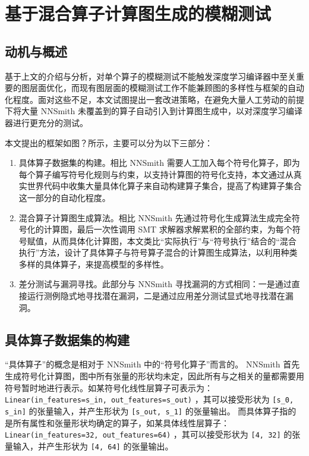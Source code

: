 
\chapter{基于混合算子计算图生成的模糊测试}

\section{动机与概述}

基于上文的介绍与分析，对单个算子的模糊测试不能触发深度学习编译器中至关重要的图层面优化，而现有图层面的模糊测试工作不能兼顾图的多样性与框架的自动化程度。面对这些不足，本文试图提出一套改进策略，在避免大量人工劳动的前提下将大量 NNSmith 未覆盖到的算子自动引入到计算图生成中，以对深度学习编译器进行更充分的测试。

本文提出的框架如图？所示，主要可以分为以下三部分：
\begin{enumerate}
    \item 具体算子数据集的构建。相比 NNSmith 需要人工加入每个符号化算子，即为每个算子编写符号化规则与约束，以支持计算图的符号化支持，本文通过从真实世界代码中收集大量具体化算子来自动构建算子集合，提高了构建算子集合这一部分的自动化程度。
    \item 混合算子计算图生成算法。相比 NNSmith 先通过符号化生成算法生成完全符号化的计算图，最后一次性调用 SMT 求解器求解累积的全部约束，为每个符号赋值，从而具体化计算图，本文类比“实际执行”与“符号执行”结合的“混合执行”方法，设计了具体算子与符号算子混合的计算图生成算法，以利用种类多样的具体算子，来提高模型的多样性。
    \item 差分测试与漏洞寻找。此部分与 NNSmith 寻找漏洞的方式相同：一是通过直接运行测例隐式地寻找潜在漏洞，二是通过应用差分测试显式地寻找潜在漏洞。
\end{enumerate}

\section{具体算子数据集的构建}

“具体算子”的概念是相对于 NNSmith 中的“符号化算子”而言的。 NNSmith 首先生成符号化计算图，图中所有张量的形状均未定，因此所有与之相关的量都需要用符号暂时地进行表示。如某符号化线性层算子可表示为： \texttt{Linear(in\_features=s\_in, out\_features=s\_out)} ，其可以接受形状为 \texttt{[s\_0, s\_in]} 的张量输入，并产生形状为 \texttt{[s\_out, s\_1]} 的张量输出。
而具体算子指的是所有属性和张量形状均确定的算子，如某具体线性层算子： \texttt{Linear(in\_features=32, out\_features=64)} ，其可以接受形状为 \texttt{[4, 32]} 的张量输入，并产生形状为 \texttt{[4, 64]} 的张量输出。

